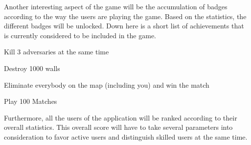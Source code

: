 Another interesting aspect of the game will be the accumulation of badges according to the way the users are playing the game. Based on the statistics, the different badges will be unlocked. Down here is a short list of achievements that is currently considered to be included in the game.
\begin{multicols}{2}
  \begin{description}[style=nextline]
    \item [Collateral Dommage] Kill 3 adversaries at the same time
    \item [Excavator] Destroy 1000 walls
    \item [Kamikaze] Eliminate everybody on the map (including you) and win the match
    \item [Veteran] Play 100 Matches
  \end{description}
\end{multicols}
Furthermore, all the users of the application will be ranked according to their overall statistics. This overall score will have to take several parameters into consideration to favor active users and distinguish skilled users at the same time. \\

 
